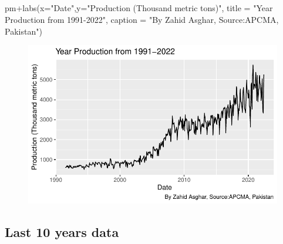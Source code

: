 \documentclass[
  letterpaper,
  DIV=11,
  numbers=noendperiod]{scrartcl}
\newenvironment{Shaded}{\begin{snugshade}}{\end{snugshade}}
\newcommand{\AttributeTok}[1]{\textcolor[rgb]{0.40,0.45,0.13}{#1}}
\newcommand{\FunctionTok}[1]{\textcolor[rgb]{0.28,0.35,0.67}{#1}}
\newcommand{\NormalTok}[1]{\textcolor[rgb]{0.00,0.23,0.31}{#1}}
\newcommand{\SpecialCharTok}[1]{\textcolor[rgb]{0.37,0.37,0.37}{#1}}
\newcommand{\StringTok}[1]{\textcolor[rgb]{0.13,0.47,0.30}{#1}}
\begin{document}
\hypertarget{section-1}{%
\subsection{}\label{section-1}}

\begin{Shaded}
\begin{Highlighting}[]
\NormalTok{pm}\SpecialCharTok{+}\FunctionTok{labs}\NormalTok{(}\AttributeTok{x=}\StringTok{"Date"}\NormalTok{,}\AttributeTok{y=}\StringTok{"Production (Thousand metric tons)"}\NormalTok{, }\AttributeTok{title =} \StringTok{"Year Production from 1991{-}2022"}\NormalTok{, }\AttributeTok{caption =} \StringTok{"By Zahid Asghar, Source:APCMA, Pakistan"}\NormalTok{)}
\end{Highlighting}
\end{Shaded}

\begin{figure}[H]

{\centering \includegraphics[width=17.1875in,height=\textheight]{cement_files/figure-pdf/unnamed-chunk-8-1.pdf}

}

\end{figure}

\hypertarget{last-10-years-data}{%
\subsection{Last 10 years data}\label{last-10-years-data}}
\end{document}
